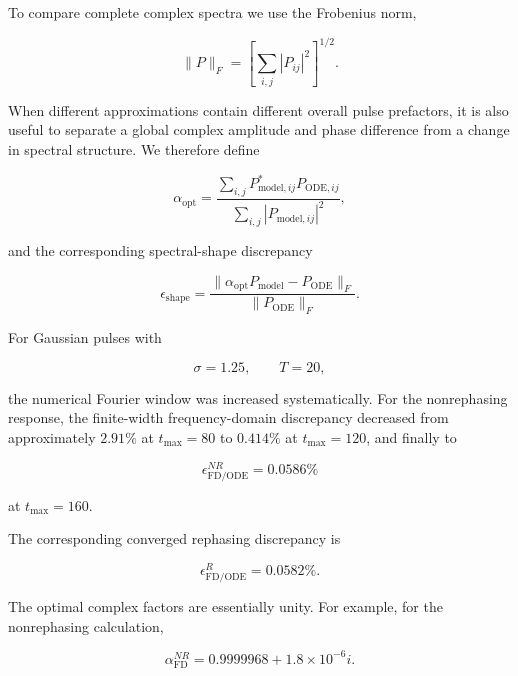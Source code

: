 \documentclass[11pt]{article}
\begin{document}
To compare complete complex spectra we use the Frobenius norm,

\begin{equation}
\|P\|_F
=
\left[
\sum_{i,j}
|P_{ij}|^2
\right]^{1/2}.
\end{equation}

When different approximations contain different overall pulse
prefactors, it is also useful to separate a global complex amplitude
and phase difference from a change in spectral structure.  We therefore
define

\begin{equation}
\alpha_{\mathrm{opt}}
=
\frac{
\sum_{i,j}
P_{\mathrm{model},ij}^{*}
P_{\mathrm{ODE},ij}
}{
\sum_{i,j}
|P_{\mathrm{model},ij}|^2
},
\label{eq:third_order_alpha_opt}
\end{equation}

and the corresponding spectral-shape discrepancy

\begin{equation}
\epsilon_{\mathrm{shape}}
=
\frac{
\|
\alpha_{\mathrm{opt}}
P_{\mathrm{model}}
-
P_{\mathrm{ODE}}
\|_F
}{
\|
P_{\mathrm{ODE}}
\|_F
}.
\label{eq:third_order_shape_error}
\end{equation}

For Gaussian pulses with

\begin{equation}
\sigma=1.25,
\qquad
T=20,
\end{equation}

the numerical Fourier window was increased systematically.  For the
nonrephasing response, the finite-width frequency-domain discrepancy
decreased from approximately $2.91\%$ at $t_{\max}=80$ to
$0.414\%$ at $t_{\max}=120$, and finally to

\begin{equation}
\boxed{
\epsilon_{\mathrm{FD/ODE}}^{NR}
=
0.0586\%
}
\end{equation}

at $t_{\max}=160$.

The corresponding converged rephasing discrepancy is

\begin{equation}
\boxed{
\epsilon_{\mathrm{FD/ODE}}^{R}
=
0.0582\%.
}
\end{equation}

The optimal complex factors are essentially unity.  For example, for
the nonrephasing calculation,

\begin{equation}
\alpha_{\mathrm{FD}}^{NR}
=
0.9999968
+
1.8\times10^{-6}i.
\end{equation}
\end{document}
